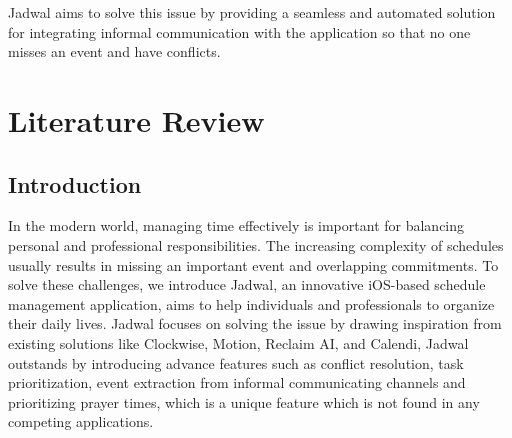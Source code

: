 \documentclass[12pt,a4paper]{report}
\begin{document}
Jadwal aims to solve this issue by providing a seamless and automated solution for integrating informal communication with the application so that no one misses an event and have conflicts. 

\chapter{Literature Review}

\section{Introduction}
In the modern world, managing time effectively is important for balancing personal and professional responsibilities. The increasing complexity of schedules usually results in missing an important event and overlapping commitments. To solve these challenges, we introduce Jadwal, an innovative iOS-based schedule management application, aims to help individuals and professionals to organize their daily lives.
Jadwal focuses on solving the issue by drawing inspiration from existing solutions like Clockwise, Motion, Reclaim AI, and Calendi, Jadwal outstands by introducing advance features such as conflict resolution, task prioritization, event extraction from informal communicating channels and prioritizing prayer times, which is a unique feature which is not found in any competing applications. 
\end{document}
